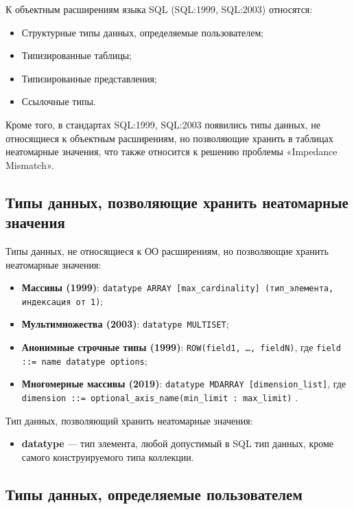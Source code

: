 \documentclass[a4paper,12pt]{article}
\begin{document}
К объектным расширениям языка SQL (SQL:1999, SQL:2003) относятся:
\begin{itemize}
    \item Структурные типы данных, определяемые пользователем;
    \item Типизированные таблицы;
    \item Типизированные представления;
    \item Ссылочные типы.
\end{itemize}

Кроме того, в стандартах SQL:1999, SQL:2003 появились типы данных, не относящиеся к объектным расширениям, но позволяющие хранить в таблицах неатомарные значения, что также относится к решению проблемы «Impedance Mismatch».

\subsection{Типы данных, позволяющие хранить неатомарные значения}

Типы данных, не относящиеся к ОО расширениям, но позволяющие хранить неатомарные значения:
\begin{itemize}
    \item \textbf{Массивы (1999)}: \texttt{datatype ARRAY [max\_cardinality] (тип\_элемента, индексация от 1)};
    \item \textbf{Мультимножества (2003)}: \texttt{datatype MULTISET};
    \item \textbf{Анонимные строчные типы (1999)}: \texttt{ROW(field1, \dots, fieldN)}, где \texttt{field ::= name datatype options};
    \item \textbf{Многомерные массивы (2019)}: \texttt{datatype MDARRAY [dimension\_list]}, где \texttt{dimension ::= optional\_axis\_name(min\_limit : max\_limit)} \cite{MisevBaumann2017}.
\end{itemize}

Тип данных, позволяющий хранить неатомарные значения:
\begin{itemize}
    \item \textbf{datatype} --- тип элемента, любой допустимый в SQL тип данных, кроме самого конструируемого типа коллекции.
\end{itemize}

\subsection{Типы данных, определяемые пользователем}
\end{document}
